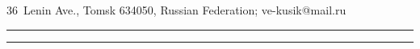 36~Lenin Ave., Tomsk 634050, Russian Federation; \mbox{ve-kusik@mail.ru}





\vspace*{8pt}





\hrule





\vspace*{2pt}





\hrule





















\def\tit{ИССЛЕДОВАНИЕ СИСТЕМЫ МАССОВОГО ОБСЛУЖИВАНИЯ MMPP/GI/$\infty$ 


С~ТРЕБОВАНИЯМИ СЛУЧАЙНОГО ОБЪЕМА$^*$}





\def\aut{Е.\,Ю.~Лисовская$^1$, С.\,П.~Моисеева$^2$, М.~Пагано$^3$, В.\,В.~Потатуева$^4$}








\def\titkol{Исследование системы массового обслуживания MMPP/GI/$\infty$ 


с~требованиями случайного объема}





\def\autkol{Е.\,Ю.~Лисовская, С.\,П.~Моисеева, М.~Пагано, В.\,В.~Потатуева}





{\renewcommand{\thefootnote}{\fnsymbol{footnote}}


}








